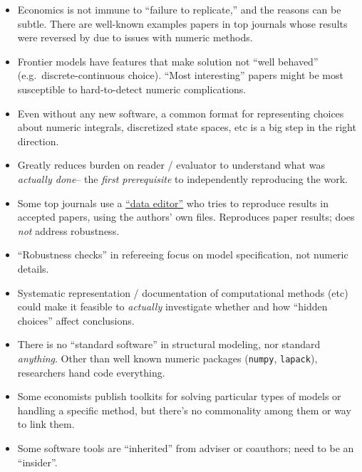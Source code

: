 \documentclass[12pt,pdftex,letterpaper]{article}
\begin{document}
\begin{itemize}
	\item Economics is not immune to ``failure to replicate,'' and the reasons can be subtle. There are well-known examples papers in top journals whose results were reversed by due to issues with numeric methods.
	
	\item Frontier models have features that make solution not ``well behaved'' (e.g.\ discrete-continuous choice). ``Most interesting'' papers might be most susceptible to hard-to-detect numeric complications.
	
	\item Even without any new software, a common format for representing choices about numeric integrals, discretized state spaces, etc is a big step in the right direction.
	
	\item Greatly reduces burden on reader / evaluator to understand what was \textit{actually done}-- the \textit{first prerequisite} to independently reproducing the work.
	
	\item Some top journals use a \href{https://www.econometricsociety.org/publications/es-data-editor-website}{``data editor''} who tries to reproduce results in accepted papers, using the authors' own files. Reproduces paper results; does \textit{not} address robustness.
	
	\item ``Robustness checks'' in refereeing focus on model specification, not numeric details.
	
	\item Systematic representation / documentation of computational methods (etc) could make it feasible to \textit{actually} investigate whether and how ``hidden choices'' affect conclusions.
	
	\item There is no ``standard software'' in structural modeling, nor standard \textit{anything}. Other than well known numeric packages (\texttt{numpy}, \texttt{lapack}), researchers hand code everything.
	
	\item Some economists publish toolkits for solving particular types of models or handling a specific method, but there's no commonality among them or way to link them.
	
	\item Some software tools are ``inherited'' from adviser or coauthors; need to be an ``insider''.
	

\end{itemize}
\end{document}
